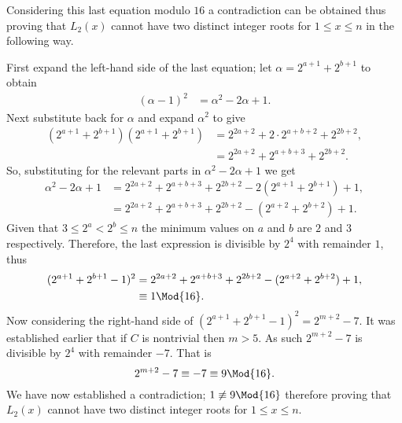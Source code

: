 Considering this last equation modulo $16$ a contradiction can be obtained thus proving that $L_2(x)$ cannot have two distinct integer roots for $1\leq x \leq n$ in the following way.

First expand the left-hand side of the last equation; let $\alpha=2^{a+1} + 2^{b+1}$ to obtain
\begin{align*}
	(\alpha -1)^2 &= \alpha^2 - 2\alpha + 1.
\end{align*}
Next substitute back for $\alpha$ and  expand $\alpha^2$ to give
\begin{align*}
	(2^{a+1} + 2^{b+1})(2^{a+1} + 2^{b+1}) &= 2^{2a+2} + 2\cdot 2^{a+b+2} + 2^{2b+2},\\
	 &= 2^{2a+2} + 2^{a+b+3} + 2^{2b+2}.
\end{align*}
So, substituting for the relevant parts in $\alpha^2 - 2\alpha + 1$ we get
\begin{align*}
	\alpha^2 - 2\alpha + 1 &= 2^{2a+2} + 2^{a+b+3} + 2^{2b+2} - 2(2^{a+1} + 2^{b+1}) + 1,\\
	&= 2^{2a+2} + 2^{a+b+3} + 2^{2b+2} - (2^{a+2} + 2^{b+2}) + 1.
\end{align*}
Given that $3\leq 2^a < 2^b \leq n$ the minimum values on $a$ and $b$ are $2$ and $3$ respectively.  Therefore, the last expression is divisible by $2^4$ with remainder $1$, thus
\begin{align*}
	(2^{a+1} + 2^{b+1} - 1)^2 &= 2^{2a+2} + 2^{a+b+3} + 2^{2b+2} - (2^{a+2} + 2^{b+2}) + 1,\\
	&\equiv 1 \Mod{16}.
\end{align*}
Now considering the right-hand side of $(2^{a+1} + 2^{b+1} - 1)^2 = 2^{m+2} - 7$. It was established earlier that if $C$ is nontrivial then $m>5$. As such $2^{m+2} - 7$ is divisible by $2^4$ with remainder $-7$. That is
\[
	2^{m+2} - 7 \equiv -7 \equiv 9 \Mod{16}.
\]
We have now established a contradiction; $1\not\equiv 9 \Mod{16}$ therefore proving that $L_2(x)$ cannot have two distinct integer roots for  $1\leq x \leq n$.
